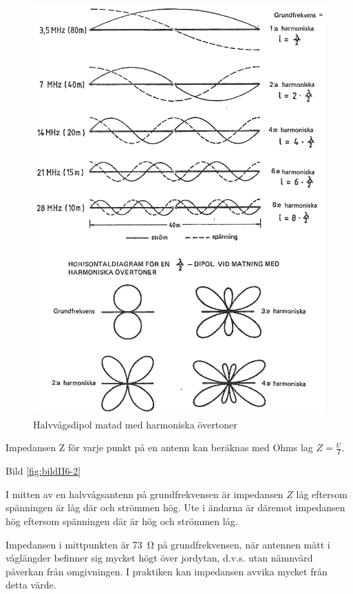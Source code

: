 \begin{figure}
  \includegraphics[width=\textwidth]{images/cropped_pdfs/bild_2_6-03.pdf}
  \caption{Halvvågsdipol matad med harmoniska övertoner}
  \label{fig:bildII6-3}
\end{figure}

Impedansen Z för varje punkt på en antenn kan beräknas med Ohms lag
\(Z = \frac{U}{I}\).

Bild \ref{fig:bildII6-2}

I mitten av en halvvågsantenn på grundfrekvensen är impedansen \(Z\)
låg eftersom spänningen är låg där och strömmen hög. Ute i ändarna är
däremot impedansen hög eftersom spänningen där är hög och strömmen
låg.

Impedansen i mittpunkten är 73~Ω på grundfrekvensen, när antennen mätt
i våglängder befinner sig mycket högt över jordytan, d.v.s. utan
nämnvärd påverkan från omgivningen. I praktiken kan impedansen avvika
mycket från detta värde.

